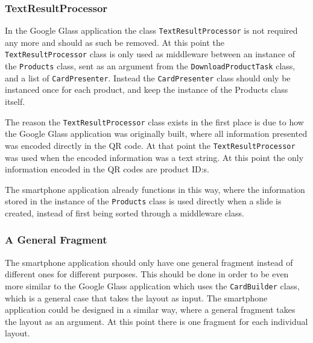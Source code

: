 

\subsubsection{TextResultProcessor}
In the Google Glass application the class \texttt{TextResultProcessor} is not required any more and should as such be removed. At this point the \texttt{TextResultProcessor} class is only used as middleware between an instance of the \texttt{Products} class, sent as an argument from the \texttt{DownloadProductTask} class, and a list of \texttt{CardPresenter}. Instead the \texttt{CardPresenter} class should only be instanced once for each product, and keep the instance of the Products class itself.

The reason the \texttt{TextResultProcessor} class exists in the first place is due to how the Google Glass application was originally built, where all information presented was encoded directly in the QR code. At that point the \texttt{TextResultProcessor} was used when the encoded information was a text string. At this point the only information encoded in the QR codes are product ID:s.

The smartphone application already functions in this way, where the information stored in the instance of the \texttt{Products} class is used directly when a slide is created, instead of first being sorted through a middleware class.


\subsubsection{A General Fragment}
The smartphone application should only have one general fragment instead of different ones for different purposes. This should be done in order to be even more similar to the Google Glass application which uses the \texttt{CardBuilder} class, which is a general case that takes the layout as input. The smartphone application could be designed in a similar way, where a general fragment takes the layout as an argument. At this point there is one fragment for each individual layout.